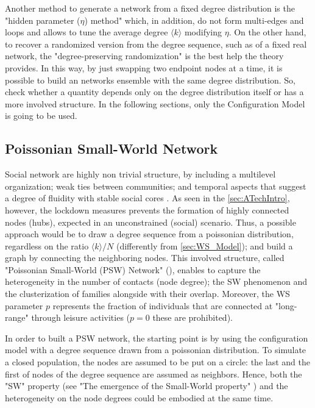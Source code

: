 \documentclass[a4paper,10pt,twoside]{book} %
\theoremstyle{definition}
\begin{document}
Another method to generate a network from a fixed degree distribution is the "hidden parameter ($\eta$) method" which, in addition, do not form multi-edges and loops \cite{barabasi::2016networkbook} and allows to tune the average degree $\langle k \rangle$ modifying $\eta$.
On the other hand, to recover a randomized version from the degree sequence, such as of a fixed real network, the "degree-preserving randomization" is the best help the theory provides. In this way, by just swapping two endpoint nodes at a time, it is possible to build an networks ensemble with the same degree distribution. So, check whether a quantity depends only on the degree distribution itself or has a more involved structure.
In the following sections, only the Configuration Model is going to be used.

\clearpage
\subsection{Poissonian Small-World Network}
\label{sec:PSW_network}
Social network are highly non trivial structure, by including a multilevel organization; weak ties between communities; and temporal aspects that suggest a degree of fluidity with stable social cores \cite{Thurner::NetBasedExpl}.
As seen in the \autoref{sec:ATechIntro}, however, the lockdown measures prevents the formation of highly connected nodes (hubs), expected in an unconstrained (social) scenario. Thus, a possible approach would be to draw a degree sequence from a poissonian distribution, regardless on the ratio $\langle k \rangle / N$ (differently from \autoref{sec:WS_Model}); and build a graph by connecting the neighboring nodes.
This involved structure, called "Poissonian Small-World (PSW) Network" (\cite{Thurner::NetBasedExpl}), enables to capture the heterogeneity in the number of contacts (node degree); the SW phenomenon and the clusterization of families alongside with their overlap. Moreover, the WS parameter $p$ represents the fraction of individuals that are connected at "long-range" through leisure activities ($p = 0$ these are prohibited).

In order to built a PSW network, the starting point is by using the configuration model with a degree sequence drawn from a poissonian distribution. To simulate a closed population, the nodes are assumed to be put on a circle: the last and the first of nodes of the degree sequence are assumed as neighbors. Hence, both the "SW" property (see "The emergence of the Small-World property" ) and the heterogeneity on the node degrees could be embodied at the same time. 
\end{document}
